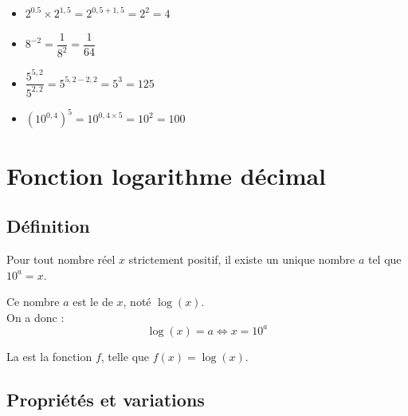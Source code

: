 \documentclass[12pt,a4paper]{article}
\begin{document}
\begin{myexs}
	
	\begin{multicols}{2}
		
	\begin{itemize}
		\item $2^{0.5} \times 2^{1,5} = 2^{0,5 + 1,5} = 2^2 = 4$
		\item $8^{-2} = \dfrac{1}{8^2} = \dfrac{1}{64}$
		\item $\dfrac{5^{5,2}}{5^{2,2}} = 5^{5,2 - 2,2} = 5^3 = 125$
		\item $(10^{0,4})^{5} = 10^{0,4 \times 5} = 10^2 = 100$
	\end{itemize}
	\end{multicols}
\end{myexs}

\newpage

\section{Fonction logarithme décimal}

\subsection{Définition}

\begin{mydef}
	
	Pour tout nombre réel $x$ strictement positif, il existe un unique nombre $a$ tel que $10^a = x$.
	
	
	Ce nombre $a$ est le  de $x$, noté $\log(x)$.\\
	
	On a donc :
	\begin{equation*}
		\log(x) = a \Leftrightarrow x = 10^a
	\end{equation*}
		
	La  est la fonction $f$, telle que $f(x)=\log(x)$.
\end{mydef}

\subsection{Propriétés et variations}
\end{document}
